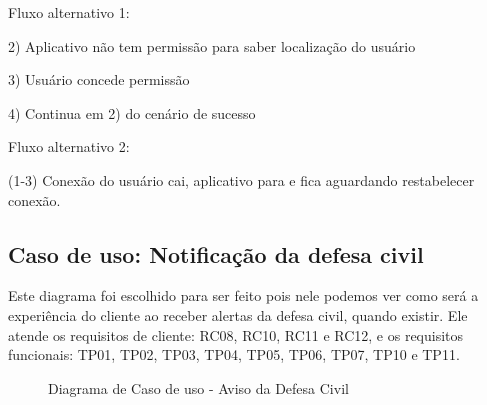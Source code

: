 \documentclass[12pt]{article}
\begin{document}
Fluxo alternativo 1:

2) Aplicativo não tem permissão para saber localização do usuário

3) Usuário concede permissão

4) Continua em 2) do cenário de sucesso

Fluxo alternativo 2:

(1-3) Conexão do usuário cai, aplicativo para e fica aguardando restabelecer conexão.

\vfill%
\pagebreak%

\subsection{Caso de uso: Notificação da defesa civil}
Este diagrama foi escolhido para ser feito pois nele podemos ver como será a experiência do cliente ao receber alertas da defesa civil, quando existir. Ele atende os requisitos de cliente: RC08, RC10, RC11 e RC12, e os requisitos funcionais: TP01, TP02, TP03, TP04, TP05, TP06, TP07, TP10 e TP11.

  \begin{figure}[!htb]
    \caption{\label{fig:diagUseCase03} Diagrama de Caso de uso - Aviso da Defesa Civil}
  \end{figure}
\end{document}
